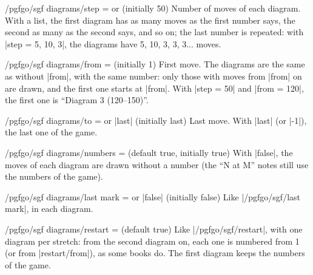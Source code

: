 
\begin{key}{/pgfgo/sgf diagrams/step =  or  (initially 50)}
	Number of moves of each diagram. With a list, the first diagram has as many moves as the first number says, the second as many as the second says, and so on; the last number is repeated: with |step = {5, 10, 3}|, the diagrams have 5, 10, 3, 3, 3... moves.
\end{key}

\begin{key}{/pgfgo/sgf diagrams/from =  (initially 1)}
	First move. The diagrams are the same as without |from|, with the same number: only those with moves from |from| on are drawn, and the first one starts at |from|. With |step = 50| and |from = 120|, the first one is ``Diagram 3 (120--150)''.
\end{key}

\begin{key}{/pgfgo/sgf diagrams/to =  or |last| (initially last)}
	Last move. With |last| (or |-1|), the last one of the game.
\end{key}

\begin{key}{/pgfgo/sgf diagrams/numbers =  (default true, initially true)}
	With |false|, the moves of each diagram are drawn without a number (the ``N at M'' notes still use the numbers of the game).
\end{key}

\begin{key}{/pgfgo/sgf diagrams/last mark =  or |false| (initially false)}
	Like |/pgfgo/sgf/last mark|, in each diagram.

	\begin{codeexample}
	\end{codeexample}

\end{key}

\begin{key}{/pgfgo/sgf diagrams/restart =  (default true)}
	Like |/pgfgo/sgf/restart|, with one diagram per stretch: from the second diagram on, each one is numbered from 1 (or from |restart/from|), as some books do. The first diagram keeps the numbers of the game.

	\begin{codeexample}
	\end{codeexample}
\end{key}


